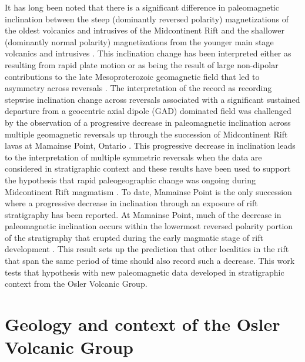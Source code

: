 \documentclass[draft,gc]{AGUTeX}
\begin{document}
\begin{article}
It has long been noted that there is a significant difference in paleomagnetic inclination between the steep (dominantly reversed polarity) magnetizations of the oldest volcanics and intrusives of the Midcontinent Rift and the shallower (dominantly normal polarity) magnetizations from the younger main stage volcanics and intrusives \citep{Halls1982a}. This inclination change has been interpreted either as resulting from rapid plate motion \citep{Robertson1971a, Davis1997a} or as being the result of large non-dipolar contributions to the late Mesoproterozoic geomagnetic field that led to asymmetry across reversals \citep{Pesonen1981a}. The interpretation of the record as recording stepwise inclination change across reversals associated with a significant sustained departure from a geocentric axial dipole (GAD) dominated field was challenged by the observation of a progressive decrease in paleomagnetic inclination across multiple geomagnetic reversals up through the succession of Midcontinent Rift lavas at Mamainse Point, Ontario \citep{Swanson-Hysell2009a, Swanson-Hysell2014a}. This progressive decrease in inclination leads to the interpretation of multiple symmetric reversals when the data are considered in stratigraphic context and these results have been used to support the hypothesis that rapid paleogeographic change was ongoing during Midcontinent Rift magmatism \citep{Buchan2013a, Swanson-Hysell2014a}. To date, Mamainse Point is the only succession where a progressive decrease in inclination through an exposure of rift stratigraphy has been reported. At Mamainse Point, much of the decrease in paleomagnetic inclination occurs within the lowermost reversed polarity portion of the stratigraphy that erupted during the early magmatic stage of rift development \citep{Swanson-Hysell2014a}. This result sets up the prediction that other localities in the rift that span the same period of time should also record such a decrease. This work tests that hypothesis with new paleomagnetic data developed in stratigraphic context from the Osler Volcanic Group. 

\section{Geology and context of the Osler Volcanic Group}

\end{article}
\end{document}
